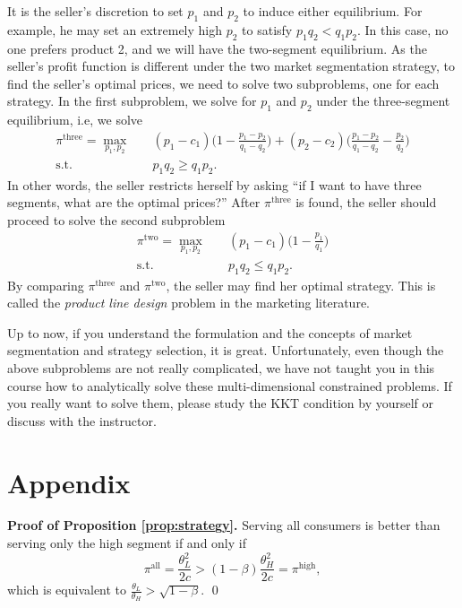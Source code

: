\documentclass[11pt,a4paper]{article}
\begin{document}
It is the seller's discretion to set $p_1$ and $p_2$ to induce either equilibrium.
For example, he may set an extremely high $p_2$ to satisfy $p_1 q_2 < q_1 p_2$.
In this case, no one prefers product 2, and we will have the two-segment equilibrium.
As the seller's profit function is different under the two market segmentation
strategy, to find the seller's optimal prices, we need to solve two subproblems,
one for each strategy. In the first subproblem, we solve for $p_1$ and $p_2$
under the three-segment equilibrium, i.e, we solve
\[\begin{split}
		\pi^{\mathrm{three}} = \max_{p_1, p_2} \quad &
		(p_1 - c_1)\bigg(1 - \frac{p_1 - p_2}{q_1 - q_2}\bigg)
		+ (p_2 - c_2)\bigg(\frac{p_1 - p_2}{q_1 - q_2} - \frac{p_2}{q_2}\bigg) \\
		\mbox{s.t.} \quad & p_1q_2 \geq q_1p_2.
	\end{split}\]
In other words, the seller restricts herself by asking ``if I want to have
three segments, what are the optimal prices?'' After $\pi^{\mathrm{three}}$ is found,
the seller should proceed to solve the second subproblem
\[\begin{split}
		\pi^{\mathrm{two}} = \max_{p_1, p_2} \quad &
		(p_1 - c_1)\bigg(1 - \frac{p_1}{q_1}\bigg) \\
		\mbox{s.t.} \quad & p_1q_2 \leq q_1p_2.
	\end{split}\]
By comparing $\pi^{\mathrm{three}}$ and $\pi^{\mathrm{two}}$, the seller may
find her optimal strategy. This is called the \textit{product line design}
problem in the marketing literature.

Up to now, if you understand the formulation and the concepts of market segmentation
and strategy selection, it is great. Unfortunately, even though the above
subproblems are not really complicated, we have not taught you in this course
how to analytically solve these multi-dimensional constrained problems.
If you really want to solve them, please study the KKT condition by yourself
or discuss with the instructor.






\section*{Appendix}

\textbf{Proof of Proposition \ref{prop:strategy}.}
Serving all consumers is better than serving only the high segment if and only if
\[
	\pi^{\mathrm{all}} = \frac{\theta_L^2}{2c}
	> (1 - \beta) \frac{\theta_H^2}{2c} = \pi^{\mathrm{high}},
\]
which is equivalent to $\frac{\theta_L}{\theta_H} > \sqrt{1 - \beta}$. \qed
\end{document}
